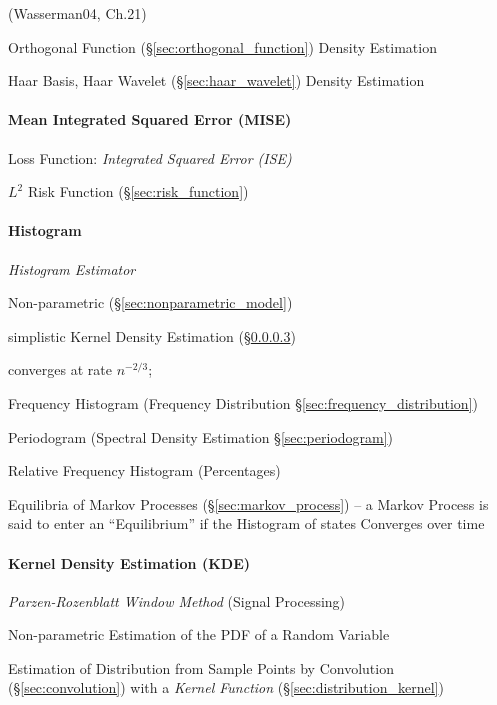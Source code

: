 (Wasserman04, Ch.21)

Orthogonal Function (\S\ref{sec:orthogonal_function}) Density Estimation

Haar Basis, Haar Wavelet (\S\ref{sec:haar_wavelet}) Density
Estimation



\paragraph{Mean Integrated Squared Error (MISE)}\label{sec:mise}\hfill

Loss Function: \emph{Integrated Squared Error (ISE)}

$L^2$ Risk Function (\S\ref{sec:risk_function})



\paragraph{Histogram}\label{sec:histogram}\hfill

\emph{Histogram Estimator}

Non-parametric (\S\ref{sec:nonparametric_model})

simplistic Kernel Density Estimation (\S\ref{sec:kde})

converges at rate $n^{-2/3}$;

Frequency Histogram (Frequency Distribution \S\ref{sec:frequency_distribution})

\fist Periodogram (Spectral Density Estimation \S\ref{sec:periodogram})

Relative Frequency Histogram (Percentages)

Equilibria of Markov Processes (\S\ref{sec:markov_process}) -- a Markov Process
is said to enter an ``Equilibrium'' if the Histogram of states Converges over
time



\paragraph{Kernel Density Estimation (KDE)}\label{sec:kde}\hfill

\emph{Parzen-Rozenblatt Window Method} (Signal Processing)

Non-parametric Estimation of the PDF of a Random Variable

Estimation of Distribution from Sample Points by Convolution
(\S\ref{sec:convolution}) with a \emph{Kernel Function}
(\S\ref{sec:distribution_kernel})

